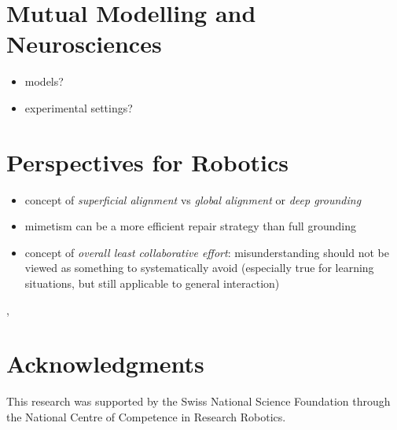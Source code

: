 \documentclass{sig-alternate}
\begin{document}
\section{Mutual Modelling and Neurosciences}

\begin{itemize}
    \item models?
    \item experimental settings?
\end{itemize}

\section{Perspectives for Robotics}

\begin{itemize}
    \item concept of \emph{superficial alignment} vs \emph{global alignment} or
        \emph{deep grounding}
    \item mimetism can be a more efficient repair strategy than full grounding
    \item concept of \emph{overall least collaborative effort}: misunderstanding should not be viewed as something to systematically
        avoid (especially true for learning situations, but still applicable to
        general interaction)
\end{itemize},


\section*{Acknowledgments}

This research was supported by the Swiss National Science Foundation through the
National Centre of Competence in Research Robotics.






\end{document}
